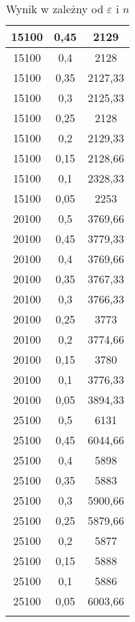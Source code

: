 \documentclass[wide,a4paper,titlepage,12pt] {article}
\begin{document}
\begin{center}
\begin{longtable}{|c|c|c|}
    15100 & 0,45 & 2129\\ \hline
    15100 & 0,4 & 2128\\ \hline
    15100 & 0,35 & 2127,33\\ \hline
    15100 & 0,3 & 2125,33\\ \hline
    15100 & 0,25 & 2128\\ \hline
    15100 & 0,2 & 2129,33\\ \hline
    15100 & 0,15 & 2128,66\\ \hline
    15100 & 0,1 & 2328,33\\ \hline
    15100 & 0,05 & 2253\\ \hline
    20100 & 0,5 & 3769,66\\ \hline
    20100 & 0,45 & 3779,33\\ \hline
    20100 & 0,4 & 3769,66\\ \hline
    20100 & 0,35 & 3767,33\\ \hline
    20100 & 0,3 & 3766,33\\ \hline
    20100 & 0,25 & 3773\\ \hline
    20100 & 0,2 & 3774,66\\ \hline
    20100 & 0,15 & 3780\\ \hline
    20100 & 0,1 & 3776,33\\ \hline
    20100 & 0,05 & 3894,33\\ \hline
    25100 & 0,5 & 6131\\ \hline
    25100 & 0,45 & 6044,66\\ \hline
    25100 & 0,4 & 5898\\ \hline
    25100 & 0,35 & 5883\\ \hline
    25100 & 0,3 & 5900,66\\ \hline
    25100 & 0,25 & 5879,66\\ \hline
    25100 & 0,2 & 5877\\ \hline
    25100 & 0,15 & 5888\\ \hline
    25100 & 0,1 & 5886\\ \hline
    25100 & 0,05 & 6003,66\\ \hline
    \caption{Wynik w zależny od $\varepsilon$ i $n$}\\
  \end{longtable}
\end{center}
\end{document}
